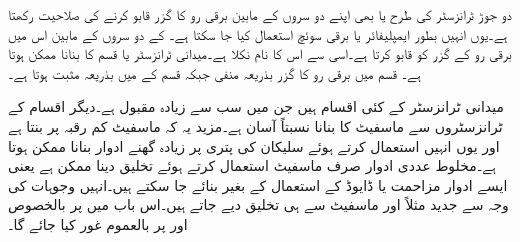 
دو جوڑ ٹرانزسٹر کی طرح  یا    بھی اپنے دو سروں کے مابین برقی رو کا گزر قابو کرنے کی صلاحیت رکھتا ہے۔یوں انہیں بطور ایمپلیفائر یا برقی سوئچ استعمال کیا جا سکتا ہے۔ کے دو سروں کے مابین  اس میں برقی رو کے گزر کو قابو کرتا ہے۔اسی سے اس کا نام  نکلا ہے۔میدانی ٹرانزسٹر  یا  قسم کا بنانا ممکن ہوتا ہے۔ قسم  میں برقی  رو کا گزر بذریعہ منفی  جبکہ  قسم کے  میں بذریعہ مثبت  ہوتا ہے۔

میدانی ٹرانزسٹر کے کئی اقسام ہیں جن میں    سب سے زیادہ مقبول ہے۔دیگر اقسام کے ٹرانزسٹروں  سے  ماسفیٹ کا بنانا نسبتاً آسان ہے۔مزید یہ کہ ماسفیٹ کم رقبہ پر بنتا ہے اور یوں انہیں استعمال کرتے ہوئے سلیکان کی پتری  پر زیادہ گھنے ادوار بنانا ممکن ہوتا ہے۔مخلوط عددی ادوار صرف ماسفیٹ استعمال کرتے ہوئے تخلیق دینا ممکن ہے یعنی ایسے ادوار مزاحمت یا ڈایوڈ کے استعمال کے بغیر بنائے جا سکتے ہیں۔انہیں وجوہات کی وجہ سے  جدید  مثلاً   اور   ماسفیٹ سے ہی تخلیق دیے جاتے ہیں۔اس باب میں   پر بالخصوص اور   پر بالعموم غور کیا جائے گا۔

